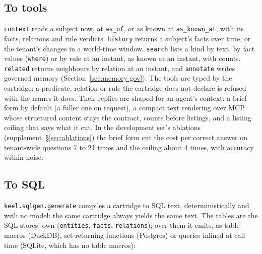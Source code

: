 \documentclass[sigconf, nonacm]{acmart}
\newcommand{\code}[1]{\texttt{#1}}
\begin{document}
\subsection{To tools}
\label{sec:tools}

\code{context} reads a subject now, at \code{as\_of}, or as known at \code{as\_known\_at}, with its facts, relations and rule verdicts. \code{history} returns a subject's facts over time, or the tenant's changes in a world-time window. \code{search} lists a kind by text, by fact values (\code{where}) or by rule at an instant, as known at an instant, with counts. \code{related} returns neighbours by relation at an instant, and \code{annotate} writes governed memory (Section~\ref{sec:memory-gov}). The tools are typed by the cartridge: a predicate, relation or rule the cartridge does not declare is refused with the names it does. Their replies are shaped for an agent's context: a brief form by default (a fuller one on request), a compact text rendering over MCP whose structured content stays the contract, counts before listings, and a listing ceiling that says what it cut. In the development set's ablations (supplement~\S\ref{sec:ablations}) the brief form cut the cost per correct answer on tenant-wide questions 7 to 21 times and the ceiling about 4 times, with accuracy within noise.

\subsection{To SQL}
\label{sec:sql}

\code{keel.sqlgen.generate} compiles a cartridge to SQL text, deterministically and with no model: the same cartridge always yields the same text. The tables are the SQL stores' own (\code{entities}, \code{facts}, \code{relations}); over them it emits, as table macros (DuckDB), set-returning functions (Postgres) or queries inlined at call time (SQLite, which has no table macros):
\end{document}
